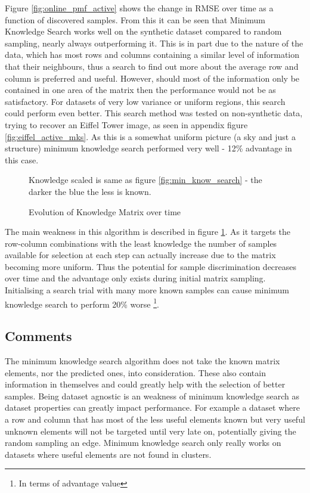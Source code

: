 Figure \ref{fig:online_pmf_active} shows the change in RMSE over time as a function of discovered samples. From this it can be seen that Minimum Knowledge Search works well on the synthetic dataset compared to random sampling, nearly always outperforming it. This is in part due to the nature of the data, which has most rows and columns containing a similar level of information that their neighbours, thus a search to find out more about the average row and column is preferred and useful. However, should most of the information only be contained in one area of the matrix then the performance would not be as satisfactory. For datasets of very low variance or uniform regions, this search could perform even better. This search method was tested on non-synthetic data, trying to recover an Eiffel Tower image, as seen in appendix figure \ref{fig:eiffel_active_mks}. As this is a somewhat uniform picture (a sky and just a structure) minimum knowledge search performed very well - 12\% advantage in this case.
\begin{figure}%
    \centering
    \qquad
    \qquad
    
    Knowledge scaled is same as figure \ref{fig:min_know_search} - the darker the blue the less is known.
    \caption{Evolution of Knowledge Matrix over time}%
    \label{fig:know_mat_it}
\end{figure}

The main weakness in this algorithm is described in figure \ref{fig:know_mat_it}. As it targets the row-column combinations with the least knowledge the number of samples available for selection at each step can actually increase due to the matrix becoming more uniform. Thus the potential for sample discrimination decreases over time and the advantage only exists during initial matrix sampling. Initialising a search trial with many more known samples can cause minimum knowledge search to perform 20\% worse \footnote{In terms of advantage value}.

\subsection{Comments}
The minimum knowledge search algorithm does not take the known matrix elements, nor the predicted ones, into consideration. These also contain information in themselves and could greatly help with the selection of better samples. Being dataset agnostic is an weakness of minimum knowledge search as dataset properties can greatly impact performance. For example a dataset where a row and column that has most of the less useful elements known but very useful unknown elements will not be targeted until very late on, potentially giving the random sampling an edge. Minimum knowledge search only really works on datasets where useful elements are not found in clusters.

